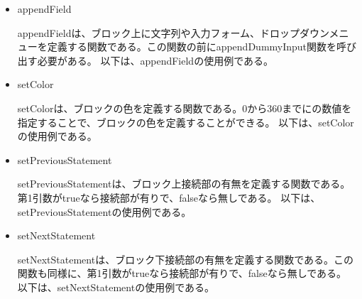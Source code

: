 \documentclass{risepaper}
\begin{document}
\begin{itemize}

\item appendField

appendFieldは、ブロック上に文字列や入力フォーム、ドロップダウンメニューを定義する関数である。この関数の前にappendDummyInput関数を呼び出す必要がある。
以下は、appendFieldの使用例である。


\item setColor

setColorは、ブロックの色を定義する関数である。0から360までにの数値を指定することで、ブロックの色を定義することができる。
以下は、setColorの使用例である。


\item setPreviousStatement

setPreviousStatementは、ブロック上接続部の有無を定義する関数である。第1引数がtrueなら接続部が有りで、falseなら無しである。
以下は、setPreviousStatementの使用例である。


\item setNextStatement

setNextStatementは、ブロック下接続部の有無を定義する関数である。この関数も同様に、第1引数がtrueなら接続部が有りで、falseなら無しである。
以下は、setNextStatementの使用例である。



\end{itemize}
\end{document}
